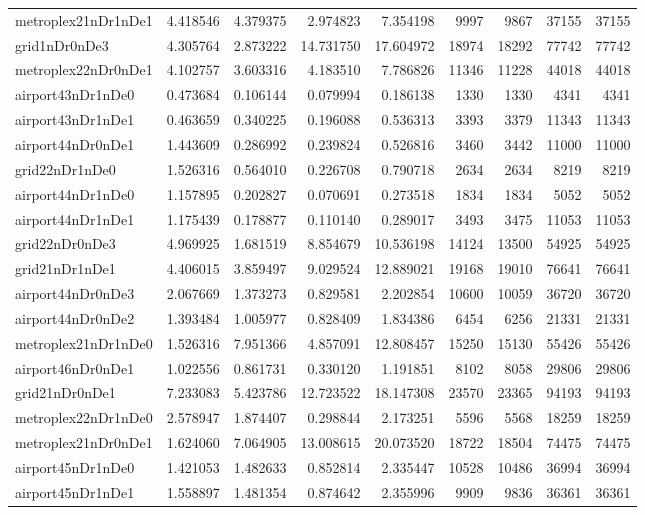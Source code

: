\begin{longtable}{|l|r|r|r|r|r|r|r|r|}
metroplex21nDr1nDe1 & 4.418546 & 4.379375 & 2.974823 & 7.354198 & 9997 & 9867 & 37155 & 37155 \\
grid1nDr0nDe3 & 4.305764 & 2.873222 & 14.731750 & 17.604972 & 18974 & 18292 & 77742 & 77742 \\
metroplex22nDr0nDe1 & 4.102757 & 3.603316 & 4.183510 & 7.786826 & 11346 & 11228 & 44018 & 44018 \\
airport43nDr1nDe0 & 0.473684 & 0.106144 & 0.079994 & 0.186138 & 1330 & 1330 & 4341 & 4341 \\
airport43nDr1nDe1 & 0.463659 & 0.340225 & 0.196088 & 0.536313 & 3393 & 3379 & 11343 & 11343 \\
airport44nDr0nDe1 & 1.443609 & 0.286992 & 0.239824 & 0.526816 & 3460 & 3442 & 11000 & 11000 \\
grid22nDr1nDe0 & 1.526316 & 0.564010 & 0.226708 & 0.790718 & 2634 & 2634 & 8219 & 8219 \\
airport44nDr1nDe0 & 1.157895 & 0.202827 & 0.070691 & 0.273518 & 1834 & 1834 & 5052 & 5052 \\
airport44nDr1nDe1 & 1.175439 & 0.178877 & 0.110140 & 0.289017 & 3493 & 3475 & 11053 & 11053 \\
grid22nDr0nDe3 & 4.969925 & 1.681519 & 8.854679 & 10.536198 & 14124 & 13500 & 54925 & 54925 \\
grid21nDr1nDe1 & 4.406015 & 3.859497 & 9.029524 & 12.889021 & 19168 & 19010 & 76641 & 76641 \\
airport44nDr0nDe3 & 2.067669 & 1.373273 & 0.829581 & 2.202854 & 10600 & 10059 & 36720 & 36720 \\
airport44nDr0nDe2 & 1.393484 & 1.005977 & 0.828409 & 1.834386 & 6454 & 6256 & 21331 & 21331 \\
metroplex21nDr1nDe0 & 1.526316 & 7.951366 & 4.857091 & 12.808457 & 15250 & 15130 & 55426 & 55426 \\
airport46nDr0nDe1 & 1.022556 & 0.861731 & 0.330120 & 1.191851 & 8102 & 8058 & 29806 & 29806 \\
grid21nDr0nDe1 & 7.233083 & 5.423786 & 12.723522 & 18.147308 & 23570 & 23365 & 94193 & 94193 \\
metroplex22nDr1nDe0 & 2.578947 & 1.874407 & 0.298844 & 2.173251 & 5596 & 5568 & 18259 & 18259 \\
metroplex21nDr0nDe1 & 1.624060 & 7.064905 & 13.008615 & 20.073520 & 18722 & 18504 & 74475 & 74475 \\
airport45nDr1nDe0 & 1.421053 & 1.482633 & 0.852814 & 2.335447 & 10528 & 10486 & 36994 & 36994 \\
airport45nDr1nDe1 & 1.558897 & 1.481354 & 0.874642 & 2.355996 & 9909 & 9836 & 36361 & 36361 \\

\end{longtable}
